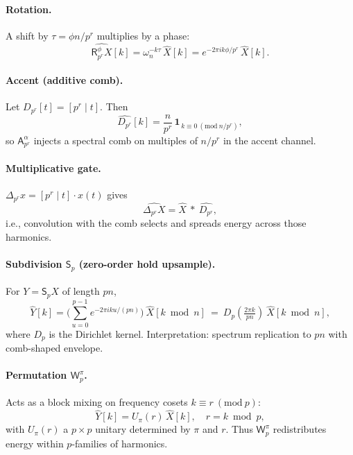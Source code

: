\documentclass[12pt]{article}
\numberwithin{equation}{section}
\theoremstyle{plain}
\theoremstyle{definition}
\theoremstyle{remark}
\begin{document}
\paragraph{Rotation.}
A shift by $\tau=\phi n/p^r$ multiplies by a phase:
\[
\widehat{\mathsf{R}_{p^r}^{\phi}X}[k]=\omega_n^{-k\tau}\,\widehat{X}[k]=e^{-2\pi i k \phi/p^r}\,\widehat{X}[k].
\]

\paragraph{Accent (additive comb).}
Let $D_{p^r}[t]=[p^r\mid t]$. Then
\[
\widehat{D_{p^r}}[k]=\frac{n}{p^r}\,\mathbf{1}_{\,k\equiv 0\ (\mathrm{mod}\ n/p^r)},
\]
so $\mathsf{A}_{p^r}^{\alpha}$ injects a spectral comb on multiples of $n/p^r$ in the accent channel.

\paragraph{Multiplicative gate.}
$\Delta_{p^r}x=[p^r\mid t]\cdot x(t)$ gives
\[
\widehat{\Delta_{p^r}X}=\widehat{X}\ \ast\ \widehat{D_{p^r}},
\]
i.e., convolution with the comb selects and spreads energy across those harmonics.

\paragraph{Subdivision $\mathsf{S}_p$ (zero-order hold upsample).}
For $Y=\mathsf{S}_p X$ of length $pn$,
\[
\widehat{Y}[k]=\Big(\sum_{u=0}^{p-1}e^{-2\pi i k u/(pn)}\Big)\ \widehat{X}[k\bmod n]
\ =\ D_p\!\left(\tfrac{2\pi k}{pn}\right)\ \widehat{X}[k\bmod n],
\]
where $D_p$ is the Dirichlet kernel. Interpretation: spectrum replication to $pn$ with comb-shaped envelope.

\paragraph{Permutation $\mathsf{W}_p^{\pi}$.}
Acts as a block mixing on frequency cosets $k\equiv r\ (\mathrm{mod}\ p)$:
\[
\widehat{Y}[k]=U_{\pi}(r)\,\widehat{X}[k],\quad r=k\bmod p,
\]
with $U_{\pi}(r)$ a $p\times p$ unitary determined by $\pi$ and $r$. Thus $\mathsf{W}_p^{\pi}$ redistributes energy within $p$-families of harmonics.
\end{document}
